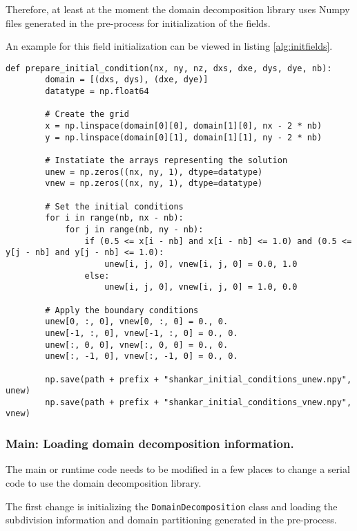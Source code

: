 Therefore, at least at the moment the domain decomposition library uses Numpy files generated in the pre-process for initialization of the fields.

An example for this field initialization can be viewed in listing \ref{alg:initfields}.

\begin{lstlisting}[caption={Example code of the domain pre-process function to initialize to fields "unew" and "vnew"},captionpos=b, label={alg:initfields}, float, floatplacement=H]
def prepare_initial_condition(nx, ny, nz, dxs, dxe, dys, dye, nb):
        domain = [(dxs, dys), (dxe, dye)]
        datatype = np.float64

        # Create the grid
        x = np.linspace(domain[0][0], domain[1][0], nx - 2 * nb)
        y = np.linspace(domain[0][1], domain[1][1], ny - 2 * nb)

        # Instatiate the arrays representing the solution
        unew = np.zeros((nx, ny, 1), dtype=datatype)
        vnew = np.zeros((nx, ny, 1), dtype=datatype)

        # Set the initial conditions
        for i in range(nb, nx - nb):
            for j in range(nb, ny - nb):
                if (0.5 <= x[i - nb] and x[i - nb] <= 1.0) and (0.5 <= y[j - nb] and y[j - nb] <= 1.0):
                    unew[i, j, 0], vnew[i, j, 0] = 0.0, 1.0
                else:
                    unew[i, j, 0], vnew[i, j, 0] = 1.0, 0.0

        # Apply the boundary conditions
        unew[0, :, 0], vnew[0, :, 0] = 0., 0.
        unew[-1, :, 0], vnew[-1, :, 0] = 0., 0.
        unew[:, 0, 0], vnew[:, 0, 0] = 0., 0.
        unew[:, -1, 0], vnew[:, -1, 0] = 0., 0.

        np.save(path + prefix + "shankar_initial_conditions_unew.npy", unew)
        np.save(path + prefix + "shankar_initial_conditions_vnew.npy", vnew)
\end{lstlisting}

\subsubsection{Main: Loading domain decomposition information.}
The main or runtime code needs to be modified in a few places to change a serial code to use the domain decomposition library.

The first change is initializing the \texttt{DomainDecomposition} class and loading the subdivision information and domain partitioning generated in the pre-process.

